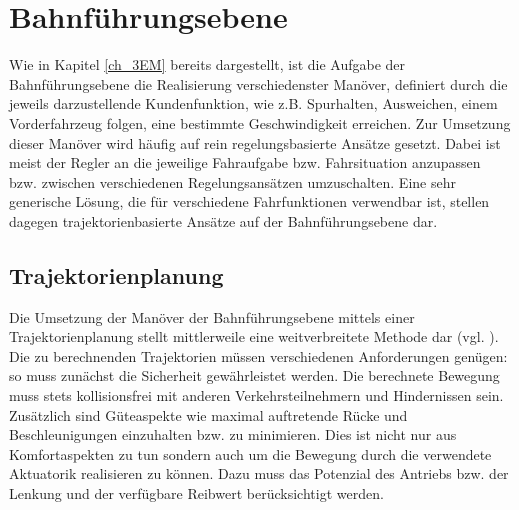 \section{Bahnführungsebene}
\label{ch_Bahnführungsebene}
Wie in Kapitel \ref{ch_3EM} bereits dargestellt, ist die Aufgabe der Bahnführungsebene die Realisierung verschiedenster Manöver,  definiert durch die jeweils darzustellende Kundenfunktion, wie z.B.  Spurhalten, Ausweichen, einem Vorderfahrzeug folgen, eine bestimmte Geschwindigkeit erreichen. 
Zur Umsetzung dieser Manöver wird häufig auf rein regelungsbasierte Ansätze gesetzt. Dabei ist meist der Regler an die jeweilige Fahraufgabe bzw.  Fahrsituation anzupassen bzw. zwischen verschiedenen Regelungsansätzen umzuschalten.  Eine sehr generische Lösung, die für verschiedene Fahrfunktionen verwendbar ist,  stellen dagegen trajektorienbasierte Ansätze auf der Bahnführungsebene dar.
\subsection{Trajektorienplanung}
Die Umsetzung der Manöver der Bahnführungsebene mittels einer Trajektorienplanung stellt mittlerweile eine weitverbreitete Methode dar (vgl.  \cite{Werling2016b}).  Die zu berechnenden Trajektorien müssen verschiedenen Anforderungen genügen: so muss zunächst die Sicherheit gewährleistet werden.  Die berechnete Bewegung muss stets kollisionsfrei mit anderen Verkehrsteilnehmern und Hindernissen sein. Zusätzlich sind Güteaspekte wie maximal auftretende Rücke und Beschleunigungen einzuhalten bzw. zu minimieren. Dies ist nicht nur aus Komfortaspekten zu tun sondern auch um die Bewegung durch die verwendete Aktuatorik realisieren zu können. Dazu muss das Potenzial des Antriebs bzw. der Lenkung und der verfügbare Reibwert berücksichtigt werden. 


